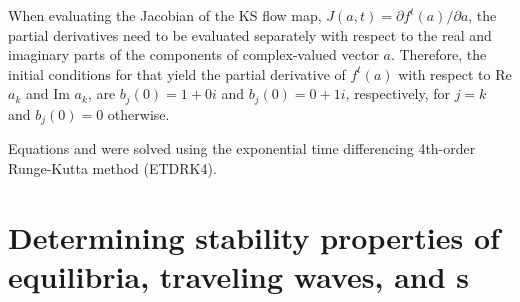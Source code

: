 When evaluating the Jacobian of the KS flow map, $J(a,t) = \partial
f^t(a)/\partial a$, the partial derivatives need to be evaluated
separately with respect to the real and imaginary parts of the
components of complex-valued vector $a$.  Therefore, the initial
conditions for  that yield the partial derivative of
$f^t(a)$ with respect to Re $a_k$ and Im $a_k$, are $b_j(0) = 1 +
0i$ and $b_j(0) = 0 + 1i$, respectively, for $j = k$ and $b_j(0) =
0$ otherwise.

Equations  and  were solved using the
exponential time differencing 4th-order Runge-Kutta method
(ETDRK4).

\section{Determining stability properties of equilibria,
traveling waves, and \rpo s} \label{sec:stability}
